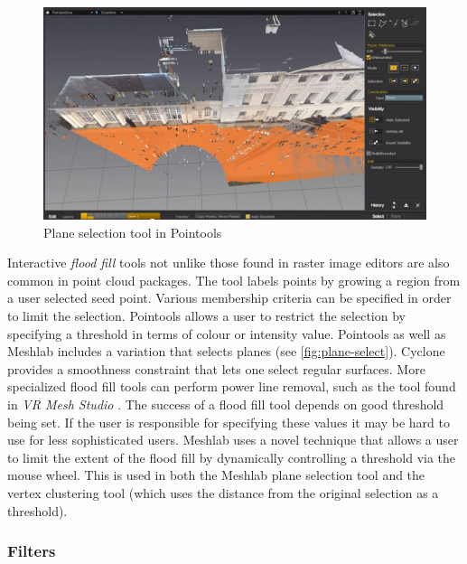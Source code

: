 
\begin{figure}[ht]
  \centering
  \includegraphics[width=1\linewidth]{images/plane}
  \caption{Plane selection tool in Pointools \cite{Pointools2012}}
  \label{fig:plane-select}
\end{figure}

Interactive \emph{flood fill} tools not unlike those found in raster image editors are also common in point cloud packages. The tool labels points by growing a region from a user selected seed point. Various membership criteria can be specified in order to limit the selection. Pointools \cite{Pointools2012} allows a user to restrict the selection by specifying a threshold in terms of colour or intensity value. Pointools as well as Meshlab includes a variation that selects planes (see \autoref{fig:plane-select}). Cyclone \cite{Leica2012} provides a smoothness constraint that lets one select regular surfaces. More specialized flood fill tools can perform power line removal, such as the tool found in \emph{VR Mesh Studio} \cite{VirtualGrid2012}. The success of a flood fill tool depends on good threshold being set. If the user is responsible for specifying these values it may be hard to use for less sophisticated users. Meshlab uses a novel technique that allows a user to limit the extent of the flood fill by dynamically controlling a threshold via the mouse wheel. This is used in both the Meshlab plane selection tool and the vertex clustering tool (which uses the distance from the original selection as a threshold).

\subsubsection{Filters} \label{section:filters}

